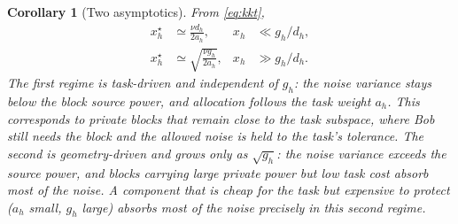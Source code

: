 \documentclass[10pt,twocolumn,letterpaper]{article}
\theoremstyle{plain}
\newtheorem{corollary}{Corollary}
\theoremstyle{definition}
\begin{document}
\begin{corollary}[Two asymptotics]
\label{co:asymptotics}
From \eqref{eq:kkt},
\begin{align}
x_h^\star&\simeq\frac{\nu d_h}{2a_h}, & x_h&\ll g_h/d_h,\label{eq:asym1}\\
x_h^\star&\simeq\sqrt{\frac{\nu g_h}{2a_h}}, & x_h&\gg g_h/d_h.\label{eq:asym2}
\end{align}
The first regime is task-driven and independent of $g_h$: the noise variance
stays below the block source power, and allocation follows the task weight
$a_h$. This corresponds to private blocks that remain close to the task
subspace, where Bob still needs the block and the allowed noise is held to the
task's tolerance. The second is geometry-driven and grows only as $\sqrt{g_h}$:
the noise variance exceeds the source power, and blocks carrying large private
power but low task cost absorb most of the noise. A component that is cheap for
the task but expensive to protect ($a_h$ small, $g_h$ large) absorbs most of
the noise precisely in this second regime.
\end{corollary}
\end{document}
